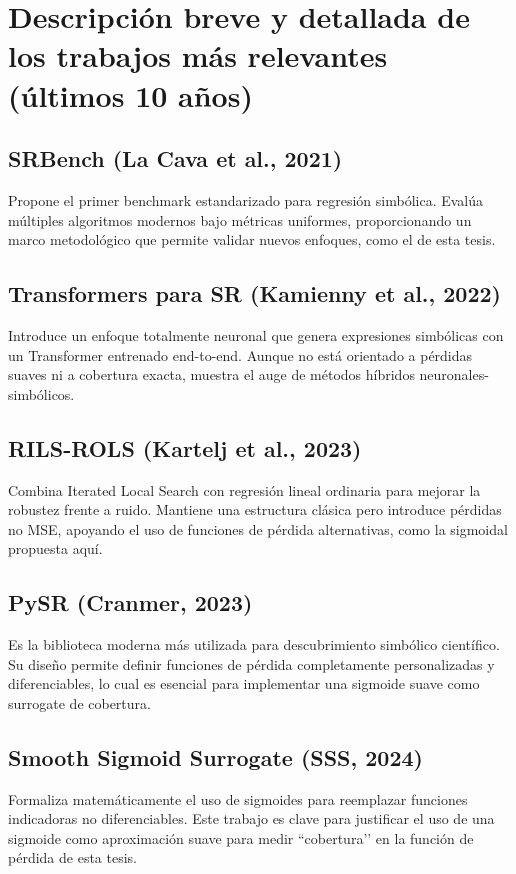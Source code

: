 \documentclass[12pt,a4paper]{article}
\begin{document}

\section*{Descripción breve y detallada de los trabajos más relevantes (últimos 10 años)}

\subsection*{SRBench (La Cava et al., 2021)}
Propone el primer benchmark estandarizado para regresión simbólica. Evalúa múltiples algoritmos modernos bajo métricas uniformes, proporcionando un marco metodológico que permite validar nuevos enfoques, como el de esta tesis.

\subsection*{Transformers para SR (Kamienny et al., 2022)}
Introduce un enfoque totalmente neuronal que genera expresiones simbólicas con un Transformer entrenado end-to-end. Aunque no está orientado a pérdidas suaves ni a cobertura exacta, muestra el auge de métodos híbridos neuronales-simbólicos.

\subsection*{RILS-ROLS (Kartelj et al., 2023)}
Combina Iterated Local Search con regresión lineal ordinaria para mejorar la robustez frente a ruido. Mantiene una estructura clásica pero introduce pérdidas no MSE, apoyando el uso de funciones de pérdida alternativas, como la sigmoidal propuesta aquí.

\subsection*{PySR (Cranmer, 2023)}
Es la biblioteca moderna más utilizada para descubrimiento simbólico científico. Su diseño permite definir funciones de pérdida completamente personalizadas y diferenciables, lo cual es esencial para implementar una sigmoide suave como surrogate de cobertura.

\subsection*{Smooth Sigmoid Surrogate (SSS, 2024)}
Formaliza matemáticamente el uso de sigmoides para reemplazar funciones indicadoras no diferenciables. Este trabajo es clave para justificar el uso de una sigmoide como aproximación suave para medir ``cobertura’’ en la función de pérdida de esta tesis.
\end{document}
